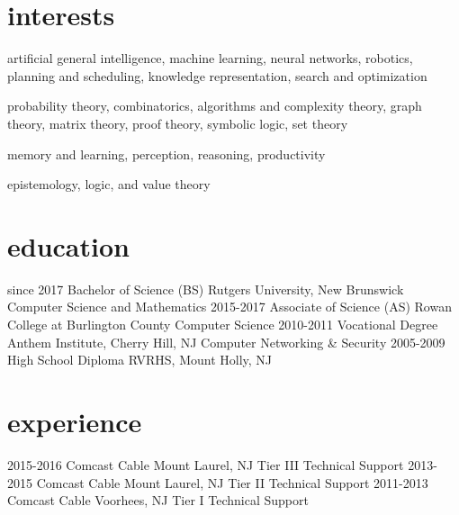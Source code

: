 \documentclass[]{friggeri-cv}
\begin{document}
\section{interests}
\begin{description}
    \addtolength\itemsep{0.25em}
    \item[Artificial Intelligence] artificial general intelligence, machine learning, neural networks, robotics, planning and scheduling, knowledge representation, search and optimization
    \item[Mathematics] probability theory, combinatorics, algorithms and complexity theory, graph theory, matrix theory, proof theory, symbolic logic, set theory
    \item[Cognitive Science] memory and learning, perception, reasoning, productivity 
    \item[Philosophy] epistemology, logic, and value theory
\end{description}

\section{education}

\begin{entrylist}
  \entry
	{since 2017}
	{Bachelor of Science (BS)}
	{Rutgers University, New Brunswick}
	{Computer Science and Mathematics}
  \entry
    {2015-2017}
    {Associate of Science (AS)}
    {Rowan College at Burlington County}
    {Computer Science}
  \entry
    {2010-2011}
    {Vocational Degree}
    {Anthem Institute, Cherry Hill, NJ}
    {Computer Networking \& Security}
  \entry
    {2005-2009}
    {High School Diploma}
    {RVRHS, Mount Holly, NJ}
    {}
\end{entrylist}

\section{experience}

\begin{entrylist}
  \entry
    {2015-2016}
    {Comcast Cable}
    {Mount Laurel, NJ}
    {Tier III Technical Support}
  \entry
    {2013-2015}
    {Comcast Cable}
    {Mount Laurel, NJ}
    {Tier II Technical Support}
  \entry
    {2011-2013}
    {Comcast Cable}
    {Voorhees, NJ}
    {Tier I Technical Support}
\end{entrylist}
\end{document}
